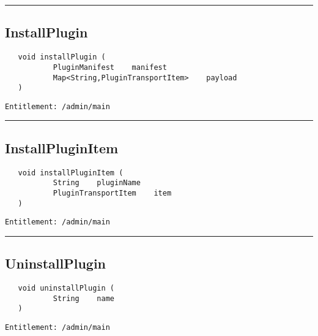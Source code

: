 \rule{12cm}{2pt}
\subsection{InstallPlugin}
\label{Api:InstallPlugin}
\begin{Verbatim}
   void installPlugin (
           PluginManifest    manifest
           Map<String,PluginTransportItem>    payload
   )
\end{Verbatim}
\begin{Verbatim}[formatcom=\color{Maroon}]
  Entitlement: /admin/main
\end{Verbatim}



\rule{12cm}{2pt}
\subsection{InstallPluginItem}
\label{Api:InstallPluginItem}
\begin{Verbatim}
   void installPluginItem (
           String    pluginName
           PluginTransportItem    item
   )
\end{Verbatim}
\begin{Verbatim}[formatcom=\color{Maroon}]
  Entitlement: /admin/main
\end{Verbatim}



\rule{12cm}{2pt}
\subsection{UninstallPlugin}
\label{Api:UninstallPlugin}
\begin{Verbatim}
   void uninstallPlugin (
           String    name
   )
\end{Verbatim}
\begin{Verbatim}[formatcom=\color{Maroon}]
  Entitlement: /admin/main
\end{Verbatim}



